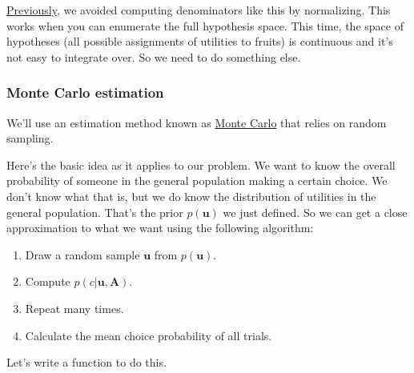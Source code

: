 \documentclass[
  letterpaper,
  DIV=11,
  numbers=noendperiod]{scrreprt}
\providecommand{\tightlist}{%
  \setlength{\itemsep}{0pt}\setlength{\parskip}{0pt}}
\begin{document}
\hyperref[normalization]{Previously}, we avoided computing denominators
like this by normalizing. This works when you can enumerate the full
hypothesis space. This time, the space of hypotheses (all possible
assignments of utilities to fruits) is continuous and it's not easy to
integrate over. So we need to do something else.

\subsubsection{Monte Carlo estimation}\label{monte-carlo}

We'll use an estimation method known as
\href{https://en.wikipedia.org/wiki/Monte_Carlo_method}{Monte Carlo}
that relies on random sampling.

Here's the basic idea as it applies to our problem. We want to know the
overall probability of someone in the general population making a
certain choice. We don't know what that is, but we do know the
distribution of utilities in the general population. That's the prior
\(p(\mathbf{u})\) we just defined. So we can get a close approximation
to what we want using the following algorithm:

\begin{enumerate}
\def\labelenumi{\arabic{enumi}.}
\tightlist
\item
  Draw a random sample \(\mathbf{u}\) from \(p(\mathbf{u})\).
\item
  Compute \(p(c|\mathbf{u}, \mathbf{A})\).
\item
  Repeat many times.
\item
  Calculate the mean choice probability of all trials.
\end{enumerate}

Let's write a function to do this.
\end{document}
